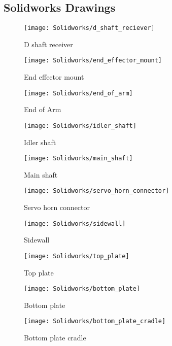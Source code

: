 \begin{flushleft}
\section{Solidworks Drawings}
\end{flushleft}
\label{app:SolidworksDrawings}
\begin{figure}[H]
	\centering
	\texttt{[image: Solidworks/d\_shaft\_reciever]}
	\caption{D shaft receiver}
	\label{fig:d_shaft_receiver}
\end{figure}
\begin{figure}[H]
\centering
\texttt{[image: Solidworks/end\_effector\_mount]}
\caption{End effector mount}
\label{fig:end_effector_mount}
\end{figure}
\begin{figure}[H]
\centering
\texttt{[image: Solidworks/end\_of\_arm]}
\caption{End of Arm}
\label{fig:end_of_arm}
\end{figure}
\begin{figure}[H]
\centering
\texttt{[image: Solidworks/idler\_shaft]}
\caption{Idler shaft}
\label{fig:idler_shaft}
\end{figure}
\begin{figure}[H]
\centering
\texttt{[image: Solidworks/main\_shaft]}
\caption{Main shaft}
\label{fig:main_shaft}
\end{figure}
\begin{figure}[H]
\centering
\texttt{[image: Solidworks/servo\_horn\_connector]}
\caption{Servo horn connector}
\label{fig:servo_horn_connector}
\end{figure}
\begin{figure}[H]
\centering
\texttt{[image: Solidworks/sidewall]}
\caption{Sidewall}
\label{fig:sidewall}
\end{figure}
\begin{figure}[H]
\centering
\texttt{[image: Solidworks/top\_plate]}
\caption{Top plate}
\label{fig:top_plate}
\end{figure}
\begin{figure}[H]
\centering
\texttt{[image: Solidworks/bottom\_plate]}
\caption{Bottom plate}
\label{fig:bottom_plate}
\end{figure}
\begin{figure}[H]
\centering
\texttt{[image: Solidworks/bottom\_plate\_cradle]}
\caption{Bottom plate cradle}
\label{fig:bottom_plate_cradle}
\end{figure}


